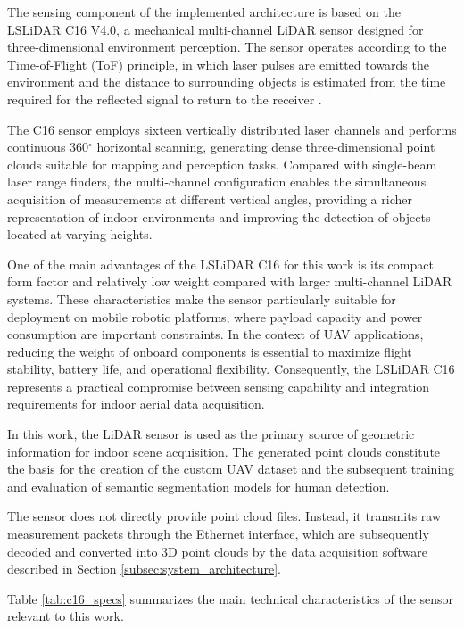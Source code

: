 The sensing component of the implemented architecture is based on the LSLiDAR C16 V4.0, a mechanical multi-channel LiDAR sensor designed for three-dimensional environment perception. The sensor operates according to the Time-of-Flight (ToF) principle, in which laser pulses are emitted towards the environment and the distance to surrounding objects is estimated from the time required for the reflected signal to return to the receiver \cite{LSLiDARC16V4}.

The C16 sensor employs sixteen vertically distributed laser channels and performs continuous 360$^\circ$ horizontal scanning, generating dense three-dimensional point clouds suitable for mapping and perception tasks. Compared with single-beam laser range finders, the multi-channel configuration enables the simultaneous acquisition of measurements at different vertical angles, providing a richer representation of indoor environments and improving the detection of objects located at varying heights.

One of the main advantages of the LSLiDAR C16 for this work is its compact form factor and relatively low weight compared with larger multi-channel LiDAR systems. These characteristics make the sensor particularly suitable for deployment on mobile robotic platforms, where payload capacity and power consumption are important constraints. In the context of UAV applications, reducing the weight of onboard components is essential to maximize flight stability, battery life, and operational flexibility. Consequently, the LSLiDAR C16 represents a practical compromise between sensing capability and integration requirements for indoor aerial data acquisition.

In this work, the LiDAR sensor is used as the primary source of geometric information for indoor scene acquisition. The generated point clouds constitute the basis for the creation of the custom UAV dataset and the subsequent training and evaluation of semantic segmentation models for human detection.

The sensor does not directly provide point cloud files. Instead, it transmits raw measurement packets through the Ethernet interface, which are subsequently decoded and converted into 3D point clouds by the data acquisition software described in Section \ref{subsec:system_architecture}.

Table \ref{tab:c16_specs} summarizes the main technical characteristics of the sensor relevant to this work.

